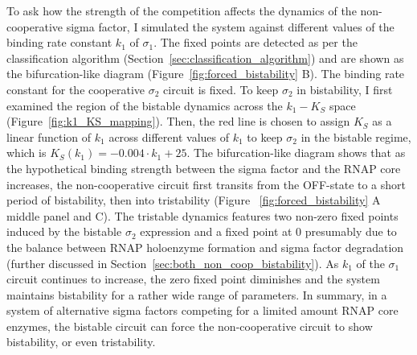 To ask how the strength of the competition affects the dynamics of the
non-cooperative sigma factor, I simulated the system against different values
of the binding rate constant $k_1$ of $\sigma_1$.
The fixed points are detected as per the classification algorithm
(Section~\ref{sec:classification_algorithm}) and are shown as the 
bifurcation-like diagram (Figure~\ref{fig:forced_bistability} B).
The binding rate constant for the cooperative $\sigma_2$ circuit is fixed.
To keep $\sigma_2$ in bistability, I first examined the region of the
bistable dynamics across the $k_1-K_S$ space (Figure~\ref{fig:k1_KS_mapping}).
Then, the red line is chosen to assign $K_S$ as a linear function of 
$k_1$ across different values of $k_1$ to keep $\sigma_2$ in the bistable regime,
which is $K_S(k_1) = -0.004 \cdot k_1 + 25$.
The bifurcation-like diagram shows that as the hypothetical binding strength
between the sigma factor and the RNAP core increases,
the non-cooperative circuit first transits from the OFF-state to a short
period of bistability, then into tristability (Figure~
\ref{fig:forced_bistability} A middle panel and C).
The tristable dynamics features two non-zero fixed points induced by
the bistable $\sigma_2$ expression and a fixed point at 0 presumably
due to the balance between RNAP holoenzyme formation and sigma
factor degradation (further discussed in Section~\ref{sec:both_non_coop_bistability}).
As $k_1$ of the $\sigma_1$ circuit continues to increase,
the zero fixed point diminishes and the system maintains bistability 
for a rather wide range of parameters.
In summary, in a system of alternative sigma factors competing for a
limited amount RNAP core enzymes, the bistable circuit can force
the non-cooperative circuit to show bistability, or even tristability.

